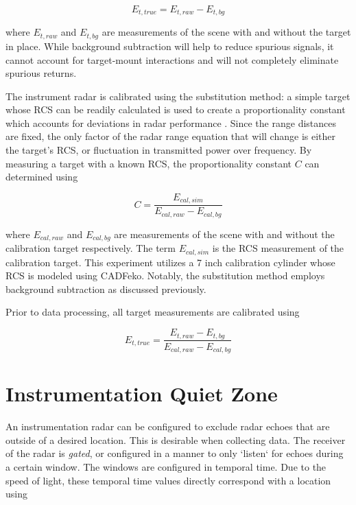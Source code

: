	    \begin{equation}
	      E_{t, true} = E_{t, raw} - E_{t, bg}
	    \end{equation}

	    where $E_{t, raw}$ and $E_{t, bg}$ are measurements of the scene with and without the target in place. While background subtraction will help to reduce spurious signals, it cannot account for target-mount interactions and will not completely eliminate spurious returns.

	    The instrument radar is calibrated using the substitution method:  a simple target whose RCS can be readily calculated is used to create a proportionality constant which accounts for deviations in radar performance \cite{Knott}. Since the range distances are fixed, the only factor of the radar range equation that will change is either the target's RCS, or fluctuation in transmitted power over frequency. By measuring a target with a known RCS, the proportionality constant $C$ can determined using

	    \begin{equation}
	      C = \frac{E_{cal, sim}}{E_{cal, raw} - E_{cal, bg}}
	    \end{equation}

	    where $E_{cal, raw}$ and $E_{cal, bg}$ are measurements of the scene with and without the calibration target respectively. The term $E_{cal, sim}$ is the RCS measurement of the calibration target. This experiment utilizes a 7 inch calibration cylinder whose RCS is modeled using CADFeko. Notably, the substitution method employs background subtraction as discussed previously.

	    Prior to data processing, all target measurements are calibrated using

	    \begin{equation}
	      E_{t, true} = \frac{E_{t, raw} - E_{t, bg}}{E_{cal, raw} - E_{cal, bg}}
	    \end{equation}

		\section{Instrumentation Quiet Zone}
			An instrumentation radar can be configured to exclude radar echoes that are outside of a desired location. This is desirable when collecting data. The receiver of the radar is \textit{gated}, or configured in a manner to only `listen` for echoes during a certain window. The windows are configured in temporal time. Due to the speed of light, these temporal time values directly correspond with a location using


